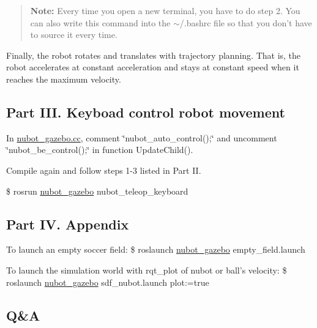 \begin{quotation}
{\bfseries Note\-:} Every time you open a new terminal, you have to do step 2. You can also write this command into the $\sim$/.bashrc file so that you don't have to source it every time.

\end{quotation}


Finally, the robot rotates and translates with trajectory planning. That is, the robot accelerates at constant acceleration and stays at constant speed when it reaches the maximum velocity.

\subsection*{Part I\-I\-I. Keyboad control robot movement}


\begin{DoxyEnumerate}
\item In \hyperlink{nubot__gazebo_8cc}{nubot\-\_\-gazebo.\-cc}, comment \char`\"{}nubot\-\_\-auto\-\_\-control();\char`\"{} and uncomment \char`\"{}nubot\-\_\-be\-\_\-control();\char`\"{} in function Update\-Child().
\item Compile again and follow steps 1-\/3 listed in Part I\-I.
\item {\ttfamily \$ rosrun \hyperlink{namespacenubot__gazebo}{nubot\-\_\-gazebo} nubot\-\_\-teleop\-\_\-keyboard}
\end{DoxyEnumerate}

\subsection*{Part I\-V. Appendix}


\begin{DoxyEnumerate}
\item To launch an empty soccer field\-: {\ttfamily \$ roslaunch \hyperlink{namespacenubot__gazebo}{nubot\-\_\-gazebo} empty\-\_\-field.\-launch}
\item To launch the simulation world with rqt\-\_\-plot of nubot or ball's velocity\-: {\ttfamily \$ roslaunch \hyperlink{namespacenubot__gazebo}{nubot\-\_\-gazebo} sdf\-\_\-nubot.\-launch plot\-:=true}
\end{DoxyEnumerate}

\subsection*{Q\&A}